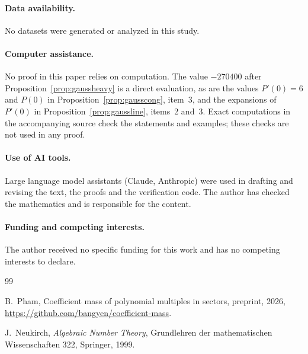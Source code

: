 \documentclass[11pt]{article}
\begin{document}
\paragraph{Data availability.}
No datasets were generated or analyzed in this study.

\paragraph{Computer assistance.}
No proof in this paper relies on computation.  The value $-270400$ after
Proposition~\ref{prop:gaussheavy} is a direct evaluation, as are the values
$P'(0)=6$ and $P(0)$ in Proposition~\ref{prop:gausscong}, item~3, and the
expansions of $P'(0)$ in Proposition~\ref{prop:gaussline}, items~2 and~3.
Exact computations in the accompanying source check the statements and
examples; these checks are not used in any proof.

\paragraph{Use of AI tools.}
Large language model assistants (Claude, Anthropic) were used in drafting and
revising the text, the proofs and the verification code.  The author has checked the mathematics and is responsible for
the content.

\paragraph{Funding and competing interests.}
The author received no specific funding for this work and has no competing
interests to declare.

\begin{thebibliography}{99}

B.~Pham,
\newblock Coefficient mass of polynomial multiples in sectors,
\newblock preprint, 2026, \url{https://github.com/bangyen/coefficient-mass}.

J.~Neukirch,
\newblock \emph{Algebraic Number Theory},
\newblock Grundlehren der mathematischen Wissenschaften 322, Springer, 1999.

\end{thebibliography}
\end{document}
